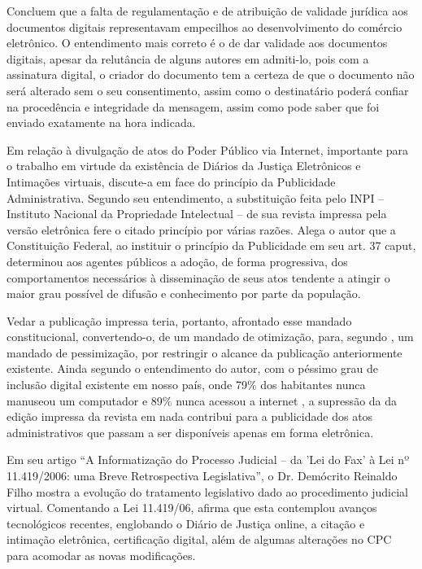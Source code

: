 	Concluem  que a falta de
  regulamentação e de atribuição de validade jurídica aos
  documentos digitais representavam empecilhos ao desenvolvimento
  do comércio eletrônico. O entendimento mais correto é o de dar
  validade aos documentos digitais, apesar da relutância de
  alguns autores em admiti-lo, pois com a assinatura digital, o
  criador do documento tem a certeza de que o documento não
  será alterado sem o seu consentimento, assim como o
  destinatário poderá confiar na procedência e integridade da
  mensagem, assim como pode saber que foi enviado exatamente na
  hora indicada. \par

	
	Em relação à divulgação de atos do Poder Público via Internet,
  importante para o trabalho em virtude da existência de Diários
  da Justiça Eletrônicos e Intimações virtuais,
   discute-a em face do princípio da
  Publicidade Administrativa.  Segundo seu entendimento, a
  substituição feita pelo INPI – Instituto Nacional da
  Propriedade Intelectual – de sua revista impressa pela versão
  eletrônica fere o citado princípio por várias razões. Alega o
  autor que a Constituição Federal, ao instituir o princípio da
  Publicidade em seu art. 37 caput, determinou aos agentes
  públicos a adoção, de forma progressiva, dos comportamentos
  necessários à disseminação de seus atos tendente a atingir o
  maior grau possível de difusão e conhecimento por parte da
  população. \par
	
	Vedar a publicação impressa teria, portanto, afrontado esse
  mandado constitucional, convertendo-o, de um mandado de
  otimização, para, segundo , um
  mandado de pessimização, por restringir o alcance da publicação
  anteriormente existente.  Ainda segundo o entendimento do
  autor, com o péssimo grau de inclusão digital existente em
  nosso país, onde 79\% dos habitantes nunca manuseou um
  computador e 89\% nunca acessou a internet
  , a supressão da
  da edição impressa da revista em nada contribui para a
  publicidade dos atos administrativos que passam a ser
  disponíveis apenas em forma eletrônica. \par
	
	
	Em seu artigo “A Informatização do Processo Judicial – da 'Lei
  do Fax' à Lei nº 11.419/2006: uma Breve Retrospectiva
  Legislativa”, o Dr. Demócrito Reinaldo Filho mostra a
  evolução do tratamento legislativo dado ao procedimento
  judicial virtual. Comentando a Lei 11.419/06, afirma que
  esta contemplou avanços tecnológicos recentes, englobando o
  Diário de Justiça online, a citação e intimação eletrônica,
  certificação digital, além de algumas alterações no CPC
  para acomodar as novas modificações.\par
	
